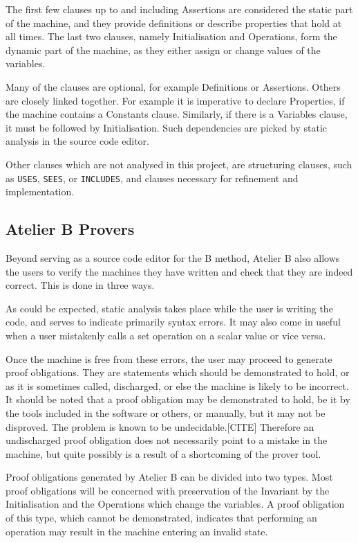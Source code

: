 \documentclass[11pt,journal]{IEEEtran}
\begin{document}
	The first few clauses up to and including Assertions are considered the static part of the machine, and they provide definitions or describe properties that hold at all times. The last two clauses, namely Initialisation and Operations, form the dynamic part of the machine, as they either assign or change values of the variables.
	
	Many of the clauses are optional, for example Definitions or Assertions. Others are closely linked together. For example it is imperative to declare Properties, if the machine contains a Constants clause. Similarly, if there is a Variables clause, it must be followed by Initialisation. Such dependencies are picked by static analysis in the source code editor.
	
	Other clauses which are not analysed in this project, are structuring clauses, such as \texttt{USES}, \texttt{SEES}, or \texttt{INCLUDES}, and clauses necessary for refinement and implementation.
	
	\subsection{Atelier B Provers}
	Beyond serving as a source code editor for the B method, Atelier B also allows the users to verify the machines they have written and check that they are indeed correct. This is done in three ways. 
	
	As could be expected, static analysis takes place while the user is writing the code, and serves to indicate primarily syntax errors. It may also come in useful when a user mistakenly calls a set operation on a scalar value or vice versa.  
	
	Once the machine is free from these errors, the user may proceed to generate proof obligations. They are statements which should be demonstrated to hold, or as it is sometimes called, discharged, or else the machine is likely to be incorrect. It should be noted that a proof obligation may be demonstrated to hold, be it by the tools included in the software or others, or manually, but it may not be disproved. The problem is known to be undecidable.[CITE] Therefore an undischarged proof obligation does not necessarily point to a mistake in the machine, but quite possibly is a result of a shortcoming of the prover tool.
	
	Proof obligations generated by Atelier B can be divided into two types. Most proof obligations will be concerned with preservation of the Invariant by the Initialisation and the Operations which change the variables. A proof obligation of this type, which cannot be demonstrated, indicates that performing an operation may result in the machine entering an invalid state.
	
\end{document}
